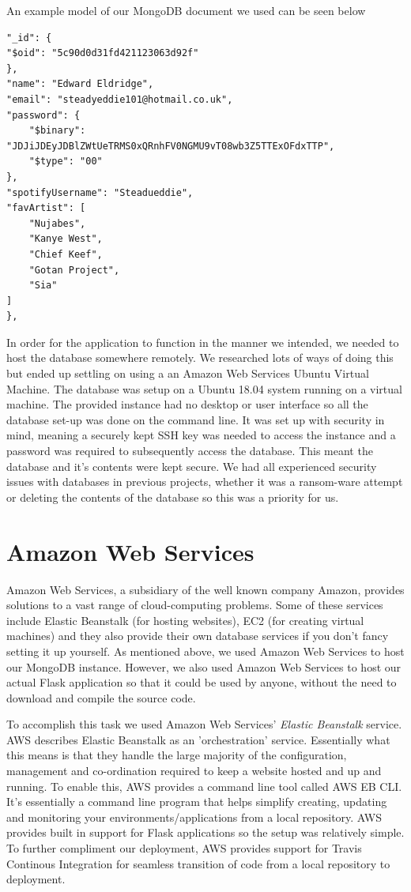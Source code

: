 An example model of our MongoDB document we used can be seen below

\begin{verbatim}
"_id": {
"$oid": "5c90d0d31fd421123063d92f"
},
"name": "Edward Eldridge",
"email": "steadyeddie101@hotmail.co.uk",
"password": {
    "$binary": "JDJiJDEyJDBlZWtUeTRMS0xQRnhFV0NGMU9vT08wb3Z5TTExOFdxTTP",
    "$type": "00"
},
"spotifyUsername": "Steadueddie",
"favArtist": [
    "Nujabes",
    "Kanye West",
    "Chief Keef",
    "Gotan Project",
    "Sia"
]
},
\end{verbatim}

In order for the application to function in the manner we intended, we needed to host the database somewhere remotely. We researched lots of ways of doing this but ended up settling on using a an Amazon Web Services Ubuntu Virtual Machine. The database was setup on a Ubuntu 18.04 system running on a virtual machine. The provided instance had no desktop or user interface so all the database set-up was done on the command line.
It was set up with security in mind, meaning a securely kept SSH key was needed to access the instance and a password was required to subsequently access the database. This meant the database and it's contents were kept secure. We had all experienced security issues with databases in previous projects, whether it was a ransom-ware attempt or deleting the contents of the database so this was a priority for us.


\section{Amazon Web Services}
Amazon Web Services, a subsidiary of the well known company Amazon, provides solutions to a vast range of cloud-computing problems. Some of these services include Elastic Beanstalk (for hosting websites), EC2 (for creating virtual machines) and they also provide their own database services if you don't fancy setting it up yourself.
As mentioned above, we used Amazon Web Services to host our MongoDB instance. However, we also used Amazon Web Services to host our actual Flask application so that it could be used by anyone, without the need to download and compile the source code.

To accomplish this task we used Amazon Web Services' \textit{Elastic Beanstalk} service. AWS describes Elastic Beanstalk as an 'orchestration' service. Essentially what this means is that they handle the large majority of the configuration, management and co-ordination required to keep a website hosted and up and running. To enable this, AWS provides a command line tool called AWS EB CLI. It's essentially a command line program that helps simplify creating, updating and monitoring your environments/applications from a local repository. 
AWS provides built in support for Flask applications so the setup was relatively simple. To further compliment our deployment, AWS provides support for Travis Continous Integration for seamless transition of code from a local repository to deployment.

